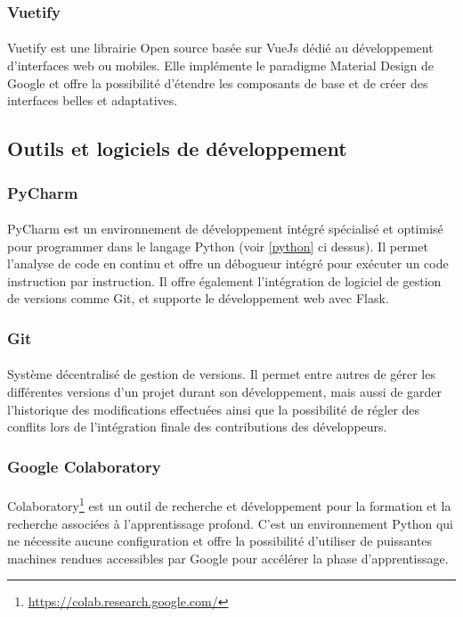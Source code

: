 		\subsubsection*{Vuetify}
		\paragraph{}
		Vuetify est une librairie Open source basée sur VueJs dédié au développement d'interfaces web ou mobiles. Elle implémente le paradigme Material Design de Google et offre la possibilité d'étendre les composants de base et de créer des interfaces belles et adaptatives.
	\subsection{Outils et logiciels de développement}
		\subsubsection*{PyCharm}
		\paragraph{}
		PyCharm est un environnement de développement intégré spécialisé et optimisé pour programmer dans le langage Python (voir \ref{python} ci dessus). Il permet l'analyse de code en continu et offre un débogueur intégré pour exécuter un code instruction par instruction. Il offre également l'intégration de logiciel de gestion de versions comme Git, et supporte le développement web avec Flask.
		
		\subsubsection*{Git}
		\paragraph{}
		Système décentralisé de gestion de versions. Il permet entre autres de gérer les différentes versions d'un projet durant son développement, mais aussi de garder l'historique des modifications effectuées ainsi que la possibilité de régler des conflits lors de l'intégration finale des contributions des développeurs.
		
		\subsubsection*{Google Colaboratory}
		\paragraph{}
		Colaboratory\footnote{\url{https://colab.research.google.com/}} est un outil de recherche et développement pour la formation et la recherche associées à l'apprentissage profond. C'est un environnement Python qui ne nécessite aucune configuration et offre la possibilité d'utiliser de puissantes machines rendues accessibles par Google pour accélérer la phase d'apprentissage.
		
